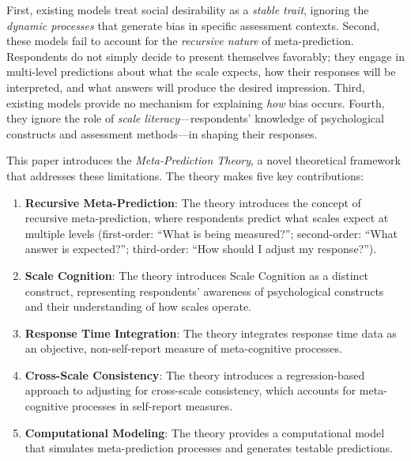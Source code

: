 \documentclass[10pt,twocolumn]{article}
\begin{document}
First, existing models treat social desirability as a \textit{stable trait}, ignoring the \textit{dynamic processes} that generate bias in specific assessment contexts. Second, these models fail to account for the \textit{recursive nature} of meta-prediction. Respondents do not simply decide to present themselves favorably; they engage in multi-level predictions about what the scale expects, how their responses will be interpreted, and what answers will produce the desired impression. Third, existing models provide no mechanism for explaining \textit{how} bias occurs. Fourth, they ignore the role of \textit{scale literacy}---respondents' knowledge of psychological constructs and assessment methods---in shaping their responses.

This paper introduces the \textit{Meta-Prediction Theory}, a novel theoretical framework that addresses these limitations. The theory makes five key contributions:

\begin{enumerate}
    \item \textbf{Recursive Meta-Prediction}: The theory introduces the concept of recursive meta-prediction, where respondents predict what scales expect at multiple levels (first-order: ``What is being measured?''; second-order: ``What answer is expected?''; third-order: ``How should I adjust my response?'').
    \item \textbf{Scale Cognition}: The theory introduces Scale Cognition as a distinct construct, representing respondents' awareness of psychological constructs and their understanding of how scales operate.
    \item \textbf{Response Time Integration}: The theory integrates response time data as an objective, non-self-report measure of meta-cognitive processes.
    \item \textbf{Cross-Scale Consistency}: The theory introduces a regression-based approach to adjusting for cross-scale consistency, which accounts for meta-cognitive processes in self-report measures.
    \item \textbf{Computational Modeling}: The theory provides a computational model that simulates meta-prediction processes and generates testable predictions.
\end{enumerate}

\end{document}
